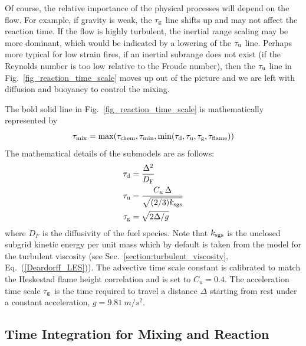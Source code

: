 Of course, the relative importance of the physical processes will depend on the flow.  For example, if gravity is weak, the $\tau_{\rm g}$ line shifts up and may not affect the reaction time. If the flow is highly turbulent, the inertial range scaling may be more dominant, which would be indicated by a lowering of the $\tau_{\rm u}$ line. Perhaps more typical for low strain fires, if an inertial subrange does not exist (if the Reynolds number is too low relative to the Froude number), then the $\tau_{\rm u}$ line in Fig.~\ref{fig_reaction_time_scale} moves up out of the picture and we are left with diffusion and buoyancy to control the mixing.

The bold solid line in Fig.~\ref{fig_reaction_time_scale} is mathematically represented by
\begin{equation}
\label{eqn_tau_mix}
\tau_{\rm mix} = \max(\tau_{\rm chem},\tau_{\rm min},\min(\tau_{\rm d},\tau_{\rm u},\tau_{\rm g},\tau_{\rm flame}))
\end{equation}
The mathematical details of the submodels are as follows:
\begin{align}
\label{eq:tau_diff} \tau_{\rm d} &= \frac{\Delta^2}{D_{\unit{F}}} \\
\label{eq:tau_sgs}  \tau_{\rm u} &= \frac{C_u \,\Delta}{\sqrt{(2/3)k_{\rm sgs}}} \\
\label{eqn_tau_grav}\tau_{\rm g} &= \sqrt{ 2\Delta/g }
\end{align}
where $D_{\unit{F}}$ is the diffusivity of the fuel species. Note that $k_{\rm sgs}$ is the unclosed subgrid kinetic energy per unit mass which by default is taken from the model for the turbulent viscosity (see Sec.~\ref{section:turbulent_viscosity}, Eq.~(\ref{Deardorff_LES})).  The advective time scale constant is calibrated to match the Heskestad flame height correlation \cite{FDS_Validation_Guide} and is set to $C_u = 0.4$. The acceleration time scale $\tau_{\rm g}$ is the time required to travel a distance $\Delta$ starting from rest under a constant acceleration, $g=\SI{9.81}{m/s^2}$.



\subsection{Time Integration for Mixing and Reaction}
\label{sec:subgrid_evironment}

